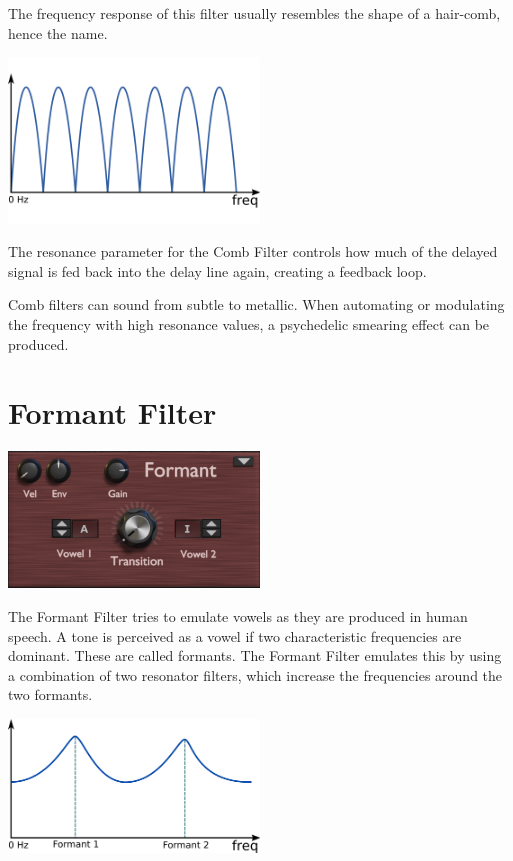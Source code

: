 The frequency response of this filter usually resembles the shape of a hair-comb, hence the name.
\begin{center}
    \includegraphics[width=0.5\textwidth]{graphics/comb_response.png}
\end{center}

The resonance parameter for the Comb Filter controls how much of the delayed signal is fed back into the delay line again, creating a feedback loop.

Comb filters can sound from subtle to metallic. When automating or modulating the frequency with high resonance values, a psychedelic smearing effect can be produced.


\section{Formant Filter}
\begin{center}
    \includegraphics[width=0.5\textwidth]{graphics/formant_filter.png}
\end{center}
The Formant Filter tries to emulate vowels as they are produced in human speech. A tone is perceived as a vowel if two characteristic frequencies are dominant. These are called formants. The Formant Filter emulates this by using a combination of two resonator filters, which increase the frequencies around the two formants.

\begin{center}
    \includegraphics[width=0.5\textwidth]{graphics/formant_response.png}
\end{center}

